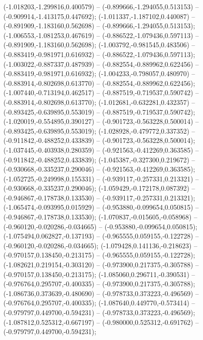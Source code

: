  (-1.018203,-1.299816,0.400579) -- (-0.899666,-1.294055,0.513153) -- (-0.909914,-1.413175,0.447692);
 (-1.011337,-1.187102,0.440087) -- (-0.891909,-1.183160,0.562698) -- (-0.899666,-1.294055,0.513153);
 (-1.006553,-1.081253,0.467619) -- (-0.886522,-1.079436,0.597113) -- (-0.891909,-1.183160,0.562698);
 (-1.003792,-0.981545,0.483506) -- (-0.883419,-0.981971,0.616932) -- (-0.886522,-1.079436,0.597113);
 (-1.003022,-0.887337,0.487939) -- (-0.882554,-0.889962,0.622456) -- (-0.883419,-0.981971,0.616932);
 (-1.004233,-0.798057,0.480970) -- (-0.883914,-0.802698,0.613770) -- (-0.882554,-0.889962,0.622456);
 (-1.007440,-0.713194,0.462517) -- (-0.887519,-0.719537,0.590742) -- (-0.883914,-0.802698,0.613770);
 (-1.012681,-0.632281,0.432357) -- (-0.893425,-0.639895,0.553019) -- (-0.887519,-0.719537,0.590742);
 (-1.020019,-0.554895,0.390127) -- (-0.901723,-0.563228,0.500014) -- (-0.893425,-0.639895,0.553019);
 (-1.028928,-0.479772,0.337352) -- (-0.911842,-0.488252,0.433839) -- (-0.901723,-0.563228,0.500014);
 (-1.037445,-0.403938,0.280359) -- (-0.921563,-0.412269,0.363585) -- (-0.911842,-0.488252,0.433839);
 (-1.045387,-0.327300,0.219672) -- (-0.930668,-0.335237,0.290046) -- (-0.921563,-0.412269,0.363585);
 (-1.052725,-0.249998,0.155331) -- (-0.939117,-0.257331,0.213321) -- (-0.930668,-0.335237,0.290046);
 (-1.059429,-0.172178,0.087392) -- (-0.946867,-0.178738,0.133530) -- (-0.939117,-0.257331,0.213321);
 (-1.065474,-0.093995,0.015929) -- (-0.953880,-0.099654,0.050815) -- (-0.946867,-0.178738,0.133530);
 (-1.070837,-0.015605,-0.058968) -- (-0.960120,-0.020286,-0.034665) -- (-0.953880,-0.099654,0.050815);
 (-1.075494,0.062827,-0.137193) -- (-0.965555,0.059155,-0.122728) -- (-0.960120,-0.020286,-0.034665);
 (-1.079428,0.141136,-0.218623) -- (-0.970157,0.138450,-0.213175) -- (-0.965555,0.059155,-0.122728);
 (-1.082621,0.219154,-0.303120) -- (-0.973900,0.217375,-0.305788) -- (-0.970157,0.138450,-0.213175);
 (-1.085060,0.296711,-0.390531) -- (-0.976764,0.295707,-0.400335) -- (-0.973900,0.217375,-0.305788);
 (-1.086736,0.373639,-0.480690) -- (-0.978733,0.373223,-0.496569) -- (-0.976764,0.295707,-0.400335);
 (-1.087640,0.449770,-0.573414) -- (-0.979797,0.449700,-0.594231) -- (-0.978733,0.373223,-0.496569);
 (-1.087812,0.525312,-0.667197) -- (-0.980000,0.525312,-0.691762) -- (-0.979797,0.449700,-0.594231);
